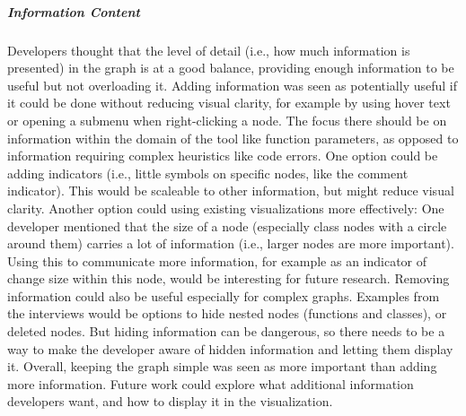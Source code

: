\documentclass[a4paper,11pt,twoside]{article}
\theoremstyle{definition} %
\begin{document}
\subparagraph{Information Content}
Developers thought that the level of detail (i.e., how much information is presented) in the graph is at a good balance, providing enough information to be useful but not overloading it. Adding information was seen as potentially useful if it could be done without reducing visual clarity, for example by using hover text or opening a submenu when right-clicking a node. The focus there should be on information within the domain of the tool like function parameters, as opposed to information requiring complex heuristics like code errors. One option could be adding indicators (i.e., little symbols on specific nodes, like the comment indicator). This would be scaleable to other information, but might reduce visual clarity. Another option could using existing visualizations more effectively: One developer mentioned that the size of a node (especially class nodes with a circle around them) carries a lot of information (i.e., larger nodes are more important). Using this to communicate more information, for example as an indicator of change size within this node, would be interesting for future research.
Removing information could also be useful especially for complex graphs. Examples from the interviews would be options to hide nested nodes (functions and classes), or deleted nodes. But hiding information can be dangerous, so there needs to be a way to make the developer aware of hidden information and letting them display it. Overall, keeping the graph simple was seen as more important than adding more information. Future work could explore what additional information developers want, and how to display it in the visualization.
\end{document}
